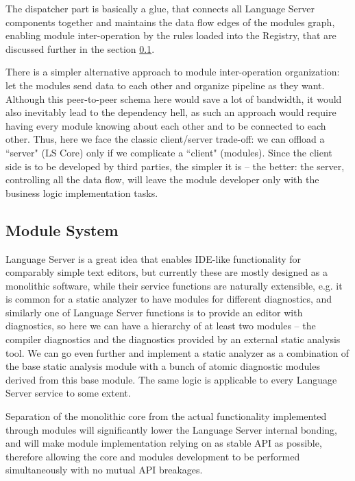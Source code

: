 The dispatcher part is basically a glue, that connects all Language Server components together and
maintains the data flow edges of the modules graph, enabling module inter-operation by the
rules loaded into the Registry, that are discussed further in the section \ref{sec:met:arch:ms}.

There is a simpler alternative approach to module inter-operation organization: let the modules send data to each other and organize pipeline as they want.
Although this peer-to-peer schema here would save a lot of bandwidth, it would also inevitably lead to the dependency hell,
as such an approach would require having every module knowing about each other and to be connected to each other.
Thus, here we face the classic client/server trade-off: we can offload a ``server" (LS Core) only
if we complicate a ``client" (modules).
Since the client side is to be developed by third parties, the simpler it is -- the better:
the server, controlling all the data flow, will leave the module developer only with the business logic implementation tasks.

\subsection{Module System}
\label{sec:met:arch:ms}

Language Server is a great idea that enables IDE-like functionality for
comparably simple text editors, but currently these are mostly designed as
a monolithic software, while their service functions are naturally extensible,
e.g. it is common for a static analyzer to have modules for different diagnostics,
and similarly one of Language Server functions is to provide an editor with diagnostics, so here we can
have a hierarchy of at least two modules -- the compiler diagnostics and the diagnostics provided by an external static analysis tool.
We can go even further and implement a static analyzer as a combination of the base static analysis module with a bunch of atomic diagnostic modules derived from this base module.
The same logic is applicable to every Language Server service to some extent.

Separation of the monolithic core from the actual functionality implemented through modules
will significantly lower the Language Server internal bonding, and will make
module implementation relying on as stable API as possible, therefore allowing the core and modules
development to be performed simultaneously with no mutual API breakages.

